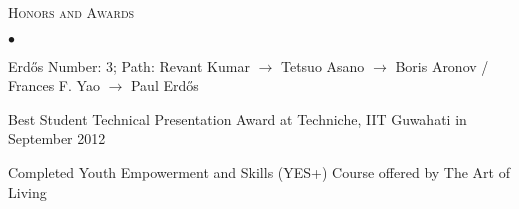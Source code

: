 \documentclass[10pt]{article}
\newcommand{\lineunder}{\\\vspace{-9pt}\hrulefill}
\newcommand{\header}[1]{{\normalsize\scshape{#1}} \lineunder}
\newenvironment{achievements}{\begin{list}{$\bullet$}{\topsep 0pt \itemsep 0pt}}{\end{list}}
\begin{document}
\vspace{3pt}

\header{Honors and Awards}
\begin{achievements}
\item Erd\H{o}s Number: 3; Path: Revant Kumar $\rightarrow$ Tetsuo Asano $\rightarrow$ Boris Aronov / Frances F. Yao $\rightarrow$ Paul Erd\H{o}s
\item Best Student Technical Presentation Award at Techniche, IIT Guwahati in September 2012
\item Completed Youth Empowerment and Skills (YES+) Course offered by The Art of Living
\end{achievements}


\end{document}
